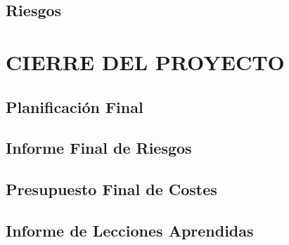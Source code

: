 \subsection{Riesgos}


\newpage
\section{CIERRE DEL PROYECTO}

\subsection{Planificación Final}

\subsection{Informe Final de Riesgos}

\subsection{Presupuesto Final de Costes}



\subsection{Informe de Lecciones Aprendidas}

